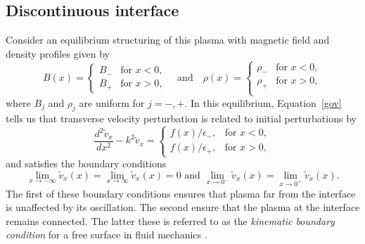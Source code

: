 \documentclass[12pt]{../style-files/ociamthesis}
\begin{document}
\subsection{Discontinuous interface}

Consider an equilibrium structuring of this plasma with magnetic field and density profiles given by
\begin{equation}
B(x)=
\begin{cases}
B_- & \text{for  }x<0, \\
B_+ & \text{for  }x>0,
\end{cases}
\quad \text{and} \quad
\rho(x)=
\begin{cases}
\rho_- & \text{for  }x<0, \\
\rho_+ & \text{for  }x>0, \\
\end{cases}
\end{equation}
where $B_j$ and $\rho_j$ are uniform for $j = -, +$. In this equilibrium, Equation~\eqref{gov} tells us that transverse velocity perturbation is related to initial perturbations by
\begin{equation}
\frac{d^2\tilde{v}_x}{dx^2} - k^2\tilde{v}_x = 
\begin{cases}
f(x)/\epsilon_-, & \text{for  } x < 0,\\
f(x)/\epsilon_+, & \text{for  } x > 0,
\end{cases}
\label{ivp interface gov}
\end{equation}
and satisfies the boundary conditions
\begin{equation}
\lim_{x \to -\infty}\tilde{v}_x(x) = \lim_{x \to \infty}\tilde{v}_x(x) = 0 \text{ and } \lim_{x \to 0^-}\tilde{v}_x(x) = \lim_{x \to 0^+}\tilde{v}_x(x).
\label{ivp interface BC}
\end{equation}
The first of these boundary conditions ensures that plasma far from the interface is unaffected by its oscillation. The second ensure that the plasma at the interface remains connected. The latter these is referred to as the \textit{kinematic boundary condition} for a free surface in fluid mechanics \citep{goe_etal04}.
\end{document}
